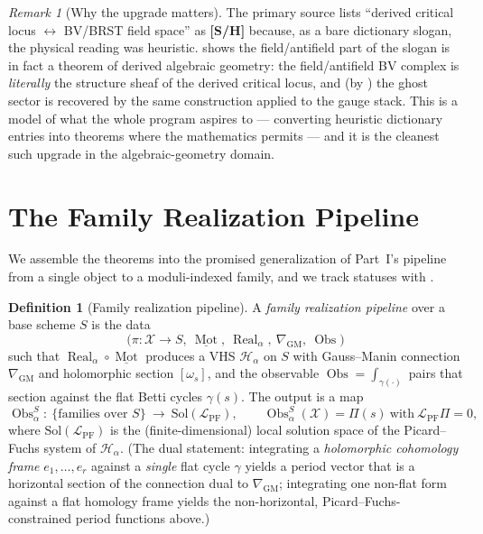 \documentclass[12pt]{article}
\theoremstyle{definition}
\newtheorem{definition}[theorem]{Definition}
\theoremstyle{remark}
\newtheorem{remark}[theorem]{Remark}
\newcommand{\Mot}{\operatorname{Mot}}
\newcommand{\Real}{\operatorname{Real}}
\newcommand{\Obs}{\operatorname{Obs}}
\newcommand{\GM}{\nabla_{\mathrm{GM}}}
\newcommand{\status}[1]{\textnormal{\textsf{\textbf{[#1]}}}}
\begin{document}
\begin{remark}[Why the upgrade matters]
The primary source lists ``derived critical locus $\leftrightarrow$ BV/BRST field space'' as \status{S/H}
because, as a bare dictionary slogan, the physical reading was heuristic.  shows the
field/antifield part of the slogan is in fact a theorem of derived algebraic geometry: the field/antifield
BV complex is \emph{literally} the structure sheaf of the derived critical locus, and (by
) the ghost sector is recovered by the same construction applied to the gauge stack. This
is a model of what the whole program aspires to --- converting heuristic dictionary entries into theorems
where the mathematics permits --- and it is the cleanest such upgrade in the algebraic-geometry domain.
\end{remark}

\section{The Family Realization Pipeline}
\label{sec:family}

We assemble the theorems into the promised generalization of Part~I's pipeline from a single object to a
moduli-indexed family, and we track statuses with .

\begin{definition}[Family realization pipeline]
\label{def:familypipeline}
A \emph{family realization pipeline} over a base scheme $S$ is the data
\[
  \bigl(\pi\colon\mathcal X\to S,\ \underline{\Mot},\ \Real_\alpha,\ \GM,\ \Obs\bigr)
\]
such that $\Real_\alpha\circ\underline{\Mot}$ produces a VHS $\mathcal H_\alpha$ on $S$ with Gauss--Manin
connection $\GM$ and holomorphic section $[\omega_s]$, and the observable
$\Obs=\int_{\gamma(\cdot)}$ pairs that section against the flat Betti cycles $\gamma(s)$. The output is a
map
\[
  \Obs_\alpha^{S}\colon\ \{\text{families over }S\}\ \longrightarrow\ \mathrm{Sol}(\mathcal L_{\mathrm{PF}}),
  \qquad \Obs_\alpha^S(\mathcal X) = \Pi(s)\ \text{with}\ \mathcal L_{\mathrm{PF}}\Pi=0,
\]
where $\mathrm{Sol}(\mathcal L_{\mathrm{PF}})$ is the (finite-dimensional) local solution space of the
Picard--Fuchs system of $\mathcal H_\alpha$. (The dual statement: integrating a \emph{holomorphic
cohomology frame} $e_1,\dots,e_r$ against a \emph{single} flat cycle $\gamma$ yields a period vector that
is a horizontal section of the connection dual to $\GM$; integrating one non-flat form against a flat
homology frame yields the non-horizontal, Picard--Fuchs-constrained period functions above.)
\end{definition}
\end{document}
